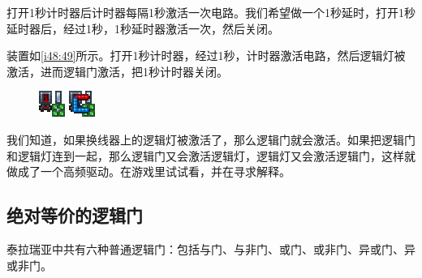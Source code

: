 \begin{example}[延时器]

打开1秒计时器后计时器每隔1秒激活一次电路。我们希望做一个1秒延时，打开1秒延时器后，经过1秒，1秒延时器激活一次，然后关闭。

装置如\autoref{i48:49}所示。打开1秒计时器，经过1秒，计时器激活电路，然后逻辑灯被激活，进而逻辑门激活，把1秒计时器关闭。

\begin{figure}[!ht]
\begin{center}
\includegraphics{images/48.png}
\qquad
\includegraphics{images/49.png}
\end{center}
\caption{}
\label{i48:49}
\end{figure}
\end{example}

\begin{example}[门驱]

我们知道，如果换线器上的逻辑灯被激活了，那么逻辑门就会激活。如果把逻辑门和逻辑灯连到一起，那么逻辑门又会激活逻辑灯，逻辑灯又会激活逻辑门，这样就做成了一个高频驱动。在游戏里试试看，并在寻求解释。
\end{example}

\subsection{绝对等价的逻辑门}
泰拉瑞亚中共有六种普通逻辑门：包括与门、与非门、或门、或非门、异或门、异或非门。

\begin{figure}[!ht]
\centering
{}
\qquad
{}
\caption{}
\end{figure}

